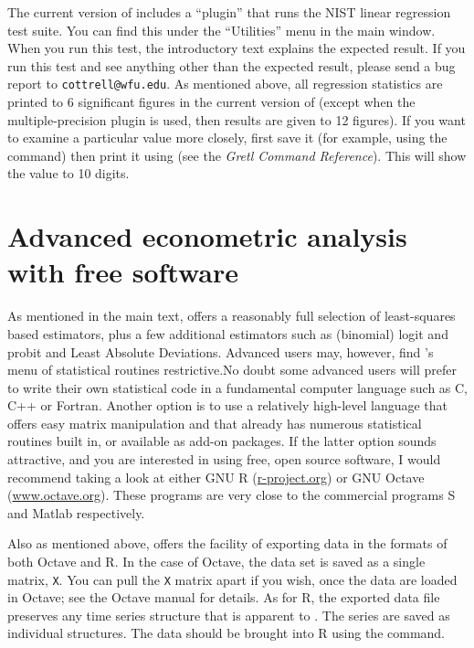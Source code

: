 The current version of  includes a ``plugin'' that runs the
NIST linear regression test suite.  You can find this under the
``Utilities'' menu in the main window.  When you run this test, the
introductory text explains the expected result.  If you run this test
and see anything other than the expected result, please send a bug
report to \verb+cottrell@wfu.edu+.  As mentioned above, all regression
statistics are printed to 6 significant figures in the current version
of  (except when the multiple-precision plugin is used,
then results are given to 12 figures).  If you want to examine a
particular value more closely, first save it (for example, using the
 command) then print it using  (see the
\emph{Gretl Command Reference}).  This will show the value to 10
digits.

\chapter{Advanced econometric analysis with free software}
\label{app-advanced}

As mentioned in the main text,  offers a reasonably full
selection of least-squares based estimators, plus a few additional
estimators such as (binomial) logit and probit and Least Absolute
Deviations. Advanced users may, however, find 's menu of
statistical routines restrictive.No doubt some advanced users will
prefer to write their own statistical code in a fundamental computer
language such as C, C++ or Fortran.  Another option is to use a
relatively high-level language that offers easy matrix manipulation
and that already has numerous statistical routines built in, or
available as add-on packages. If the latter option sounds attractive,
and you are interested in using free, open source software, I would
recommend taking a look at either GNU R
(\href{http://www.r-project.org/}{r-project.org}) or GNU Octave
(\href{http://www.octave.org/}{www.octave.org}).  These programs are
very close to the commercial programs S and Matlab respectively.
  
Also as mentioned above,  offers the facility of exporting
data in the formats of both Octave and R.  In the case of Octave, the
 data set is saved as a single matrix, \verb+X+. You can
pull the \verb+X+ matrix apart if you wish, once the data are loaded
in Octave; see the Octave manual for details.  As for R, the exported
data file preserves any time series structure that is apparent to
.  The series are saved as individual structures. The data
should be brought into R using the  command.
  
